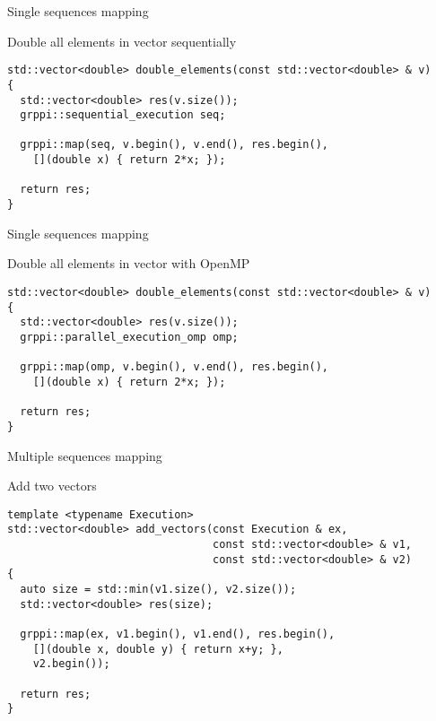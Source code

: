 \begin{frame}[t,fragile]{Single sequences mapping}
\begin{block}{Double all elements in vector sequentially}
\begin{lstlisting}
std::vector<double> double_elements(const std::vector<double> & v) 
{
  std::vector<double> res(v.size());
  grppi::sequential_execution seq;

  grppi::map(seq, v.begin(), v.end(), res.begin(), 
    [](double x) { return 2*x; });

  return res;
}
\end{lstlisting}
\end{block}
\end{frame}

\begin{frame}[t,fragile]{Single sequences mapping}
\begin{block}{Double all elements in vector with OpenMP}
\begin{lstlisting}
std::vector<double> double_elements(const std::vector<double> & v) 
{
  std::vector<double> res(v.size());
  grppi::parallel_execution_omp omp;

  grppi::map(omp, v.begin(), v.end(), res.begin(), 
    [](double x) { return 2*x; });

  return res;
}
\end{lstlisting}
\end{block}
\end{frame}

\begin{frame}[t,fragile]{Multiple sequences mapping}
\begin{block}{Add two vectors}
\begin{lstlisting}
template <typename Execution>
std::vector<double> add_vectors(const Execution & ex, 
                                const std::vector<double> & v1,
                                const std::vector<double> & v2) 
{
  auto size = std::min(v1.size(), v2.size());
  std::vector<double> res(size);

  grppi::map(ex, v1.begin(), v1.end(), res.begin(),
    [](double x, double y) { return x+y; },
    v2.begin());

  return res;
}
\end{lstlisting}
\end{block}
\end{frame}

